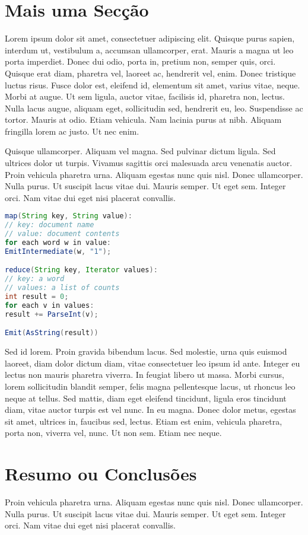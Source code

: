 \section{Mais uma Secção}

Lorem ipsum dolor sit amet, consectetuer adipiscing elit. Quisque
purus sapien, interdum ut, vestibulum a, accumsan ullamcorper,
erat. Mauris a magna ut leo porta imperdiet. Donec dui odio, porta in,
pretium non, semper quis, orci. Quisque erat diam, pharetra vel,
laoreet ac, hendrerit vel, enim. Donec tristique luctus risus. Fusce
dolor est, eleifend id, elementum sit amet, varius vitae, neque. Morbi
at augue. Ut sem ligula, auctor vitae, facilisis id, pharetra non,
lectus. Nulla lacus augue, aliquam eget, sollicitudin sed, hendrerit
eu, leo. Suspendisse ac tortor. Mauris at odio. Etiam vehicula. Nam
lacinia purus at nibh. Aliquam fringilla lorem ac justo. Ut nec
enim. 

Quisque ullamcorper. Aliquam vel magna. Sed pulvinar dictum
ligula. Sed ultrices dolor ut turpis. Vivamus sagittis orci malesuada
arcu venenatis auctor. Proin vehicula pharetra urna. Aliquam egestas
nunc quis nisl. Donec ullamcorper. Nulla purus. Ut suscipit lacus
vitae dui. Mauris semper. Ut eget sem. Integer orci. Nam vitae dui
eget nisi placerat convallis. 

\begin{lstlisting}[float,language=Java, label=src:mapreduce, caption=Example map and reduce functions for word counting]
map(String key, String value): 
// key: document name 
// value: document contents 
for each word w in value:
EmitIntermediate(w, "1");

reduce(String key, Iterator values):
// key: a word 
// values: a list of counts 
int result = 0;
for each v in values: 
result += ParseInt(v);

Emit(AsString(result))
\end{lstlisting}

Sed id lorem. Proin gravida bibendum lacus. Sed molestie, urna quis
euismod laoreet, diam dolor dictum diam, vitae consectetuer leo ipsum
id ante. Integer eu lectus non mauris pharetra viverra. In feugiat
libero ut massa. Morbi cursus, lorem sollicitudin blandit semper,
felis magna pellentesque lacus, ut rhoncus leo neque at tellus. Sed
mattis, diam eget eleifend tincidunt, ligula eros tincidunt diam,
vitae auctor turpis est vel nunc. In eu magna. Donec dolor metus,
egestas sit amet, ultrices in, faucibus sed, lectus. Etiam est enim,
vehicula pharetra, porta non, viverra vel, nunc. Ut non sem. Etiam nec
neque. 

\section{Resumo ou Conclusões}

Proin vehicula pharetra urna. Aliquam egestas
nunc quis nisl. Donec ullamcorper. Nulla purus. Ut suscipit lacus
vitae dui. Mauris semper. Ut eget sem. Integer orci. Nam vitae dui
eget nisi placerat convallis. 
